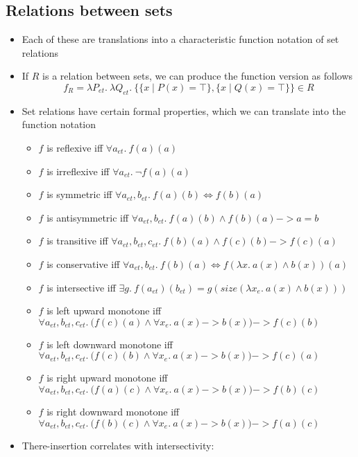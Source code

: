\documentclass[a4paper]{article}
\begin{document}
\subsection{Relations between sets}

\begin{itemize}
\item Each of these are translations into a characteristic function notation of set relations
\item If $R$ is a relation between sets, we can produce the function version as follows
  $$f_R = \lambda P_{et}.\ \lambda Q_{et}.\ \{\{x\mid P(x) = \top\},\{x\mid Q(x) = \top\}\}\in R$$
\item Set relations have certain formal properties, which we can translate into the function notation
  \begin{itemize}
  \item $f$ is reflexive iff $\forall a_{et}.\ f(a)(a)$
  \item $f$ is irreflexive iff $\forall a_{et}.\ \lnot f(a)(a)$
  \item $f$ is symmetric iff $\forall a_{et}, b_{et}.\ f(a)(b) \iff f(b)(a)$
  \item $f$ is antisymmetric iff $\forall a_{et}, b_{et}.\ f(a)(b) \land f(b)(a) -> a = b$
  \item $f$ is transitive iff $\forall a_{et}, b_{et}, c_{et}.\ f(b)(a) \land f(c)(b) -> f(c)(a)$
  \item $f$ is conservative iff $\forall a_{et}, b_{et}.\ f(b)(a) \iff f(\lambda x.\ a(x) \land b(x))(a)$
  \item $f$ is intersective iff $\exists g.\ f(a_{et})(b_{et}) = g(size(\lambda x_e.\ a(x) \land b(x)))$
  \item $f$ is left upward monotone iff $\forall a_{et}, b_{et}, c_{et}.\ \Big(f(c)(a) \land \forall x_e.\ a(x)
    -> b(x)\Big) -> f(c)(b)$
  \item $f$ is left downward monotone iff $\forall a_{et}, b_{et}, c_{et}.\ \Big(f(c)(b) \land \forall x_e.\ a(x)
    -> b(x)\Big) -> f(c)(a)$
  \item $f$ is right upward monotone iff $\forall a_{et}, b_{et}, c_{et}.\ \Big(f(a)(c) \land \forall x_e.\ a(x)
    -> b(x)\Big) -> f(b)(c)$
  \item $f$ is right downward monotone iff $\forall a_{et}, b_{et}, c_{et}.\ \Big(f(b)(c) \land \forall x_e.\ a(x)
    -> b(x)\Big) -> f(a)(c)$
  \end{itemize}
\item There-insertion correlates with intersectivity:

\end{itemize}
\end{document}
